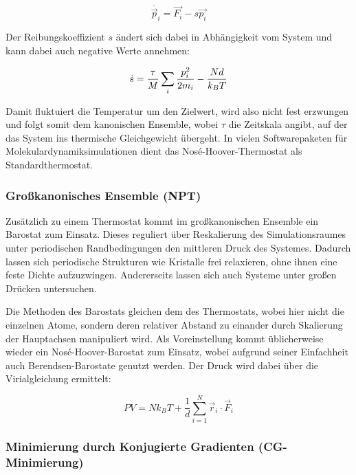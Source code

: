 \begin{equation}
  \dot{\vec p_i} = \vec{F_i} - s \vec{p_i}
\end{equation}

Der Reibungskoeffizient $s$ ändert sich dabei in Abhängigkeit vom System und kann dabei auch negative Werte annehmen:

\begin{equation}
  \dot s = {\tau \over M} \sum_i{{p_i^2 \over 2m_i} - {Nd \over k_BT}}
\end{equation}


Damit fluktuiert die Temperatur um den Zielwert, wird also nicht fest erzwungen und folgt somit dem kanonischen Ensemble, wobei $\tau$ die Zeitskala angibt, auf der das System ins thermische Gleichgewicht übergeht.
In vielen Softwarepaketen für Molekulardynamiksimulationen dient das Nosé-Hoover-Thermostat als Standardthermostat.

\subsubsection{Großkanonisches Ensemble (NPT)}

Zusätzlich zu einem Thermostat kommt im großkanonischen Ensemble ein Barostat zum Einsatz.
Dieses reguliert über Reskalierung des Simulationsraumes unter periodischen Randbedingungen den mittleren Druck des Systemes.
Dadurch lassen sich periodische Strukturen wie Kristalle frei relaxieren, ohne ihnen eine feste Dichte aufzuzwingen.
Andererseits lassen sich auch Systeme unter großen Drücken untersuchen.

Die Methoden des Barostats gleichen dem des Thermostats, wobei hier nicht die einzelnen Atome, sondern deren relativer Abstand zu einander durch Skalierung der Hauptachsen manipuliert wird.
Als Voreinstellung kommt üblicherweise wieder ein Nosé-Hoover-Barostat zum Einsatz, wobei aufgrund seiner Einfachheit auch Berendsen-Barostate genutzt werden.
Der Druck wird dabei über die Virialgleichung  ermittelt:

\begin{equation}
  PV = Nk_BT + \frac{1}{d} \sum_{i=1}^N{\vec{r}_i \cdot \vec{F}_i}
\end{equation}

\subsubsection{Minimierung durch Konjugierte Gradienten (CG-Minimierung)}

